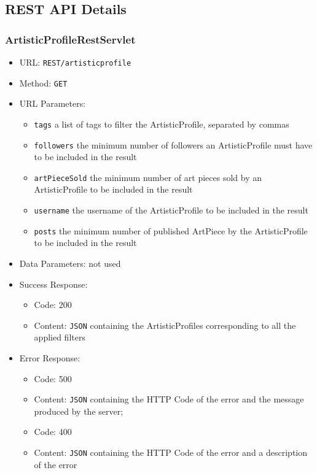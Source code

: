 \subsection{REST API Details}


\subsubsection*{ArtisticProfileRestServlet}




\begin{itemize}
    \item URL: \texttt{REST/artisticprofile}
    \item Method: \texttt{GET}
    \item URL Parameters:
    \begin{itemize}
        \item \texttt{tags} a list of tags to filter the ArtisticProfile, separated by commas
        \item \texttt{followers} the minimum number of followers an ArtisticProfile must have to be included in the result
        \item \texttt{artPieceSold} the minimum number of art pieces sold by an ArtisticProfile to be included in the result
        \item \texttt{username} the username of the ArtisticProfile to be included in the result
        \item \texttt{posts} the minimum number of published ArtPiece by the ArtisticProfile to be included in the result
    \end{itemize}
    \item Data Parameters: not used
    \item Success Response:
    \begin{itemize}
        \item Code: 200
        \item Content: \texttt{JSON} containing the ArtisticProfiles corresponding to all the applied filters
    \end{itemize}
    \item  Error Response:
    \begin{itemize}
        \item Code: 500
        \item Content: \texttt{JSON} containing the HTTP Code of the error and the message produced by the server;
        \item Code: 400
        \item Content: \texttt{JSON} containing the HTTP Code of the error and a description of the error
    \end{itemize}
    
\end{itemize}

